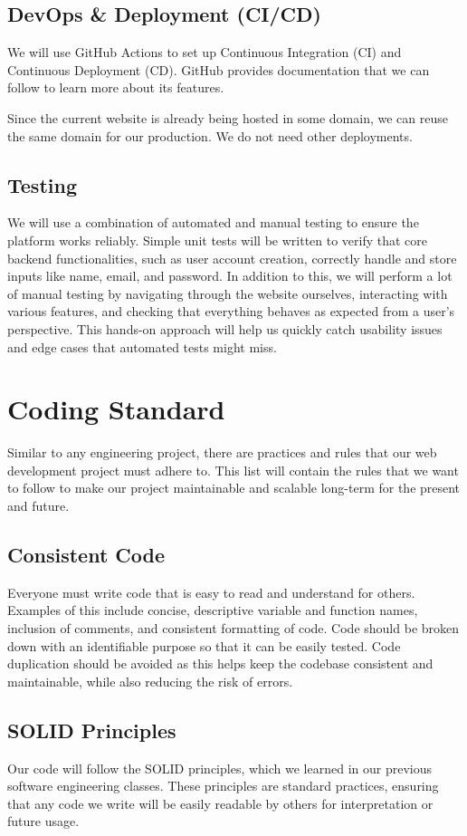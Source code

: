 \documentclass{article}
\begin{document}
\subsection{DevOps \& Deployment (CI/CD)}
We will use GitHub Actions to set up Continuous Integration (CI) and Continuous Deployment (CD). GitHub provides documentation that we can follow to learn more about its features.

Since the current website is already being hosted in some domain, we can reuse the same domain for our production. We do not need other deployments.

\subsection{Testing}
We will use a combination of automated and manual testing to ensure the platform works reliably. Simple unit tests will be written to verify that core backend functionalities, such as user account creation, correctly handle and store inputs like name, email, and password. In addition to this, we will perform a lot of manual testing by navigating through the website ourselves, interacting with various features, and checking that everything behaves as expected from a user's perspective. This hands-on approach will help us quickly catch usability issues and edge cases that automated tests might miss.

\section{Coding Standard}
Similar to any engineering project, there are practices and rules that our web development project must adhere to. This list will contain the rules that we want to follow to make our project maintainable and scalable long-term for the present and future.

\subsection{Consistent Code}
Everyone must write code that is easy to read and understand for others. Examples of this include concise, descriptive variable and function names, inclusion of comments, and consistent formatting of code. Code should be broken down with an identifiable purpose so that it can be easily tested. Code duplication should be avoided as this helps keep the codebase consistent and maintainable, while also reducing the risk of errors.

\subsection{SOLID Principles}
Our code will follow the SOLID principles, which we learned in our previous software engineering classes. These principles are standard practices, ensuring that any code we write will be easily readable by others for interpretation or future usage.
\end{document}
